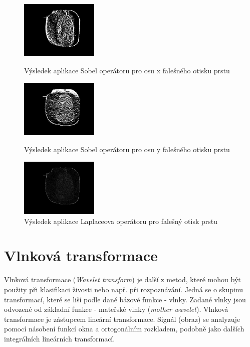 \begin{figure}[!htbp]
  \begin{minipage}[b]{0.3\linewidth}
    \centering
    \includegraphics[width=140px]{obrazky-figures/sobelxfingerprint.png}
    \caption{Výsledek aplikace Sobel operátoru pro osu x falešného otisku prstu}
  \end{minipage}
  \hspace{0.3cm}
  \begin{minipage}[b]{0.3\linewidth}
    \centering
    \includegraphics[width=140px]{obrazky-figures/sobelyfingerprint.png}
    \caption{Výsledek aplikace Sobel operátoru pro osu y falešného otisku prstu}
  \end{minipage}
  \hspace{0.3cm}
    \begin{minipage}[b]{0.3\linewidth}
    \centering
    \includegraphics[width=140px]{obrazky-figures/laplacianfingerprint.png}
    \caption{Výsledek aplikace Laplaceova operátoru pro falešný otisk prstu}
  \end{minipage}
\end{figure}

\section{Vlnková transformace}
Vlnková transformace (\textit{Wavelet transform}) je další z metod, které mohou být použity při klasifikaci živosti nebo např. při rozpoznávání. Jedná se o skupinu transformací, které se liší podle dané bázové funkce - vlnky. Zadané vlnky jsou odvozené od základní funkce - mateřské vlnky (\textit{mother wavelet}). Vlnková transformace je zástupcem lineární transformace. Signál (obraz) se analyzuje pomocí násobení funkcí okna a ortogonálním rozkladem, podobně jako dalších integrálních lineárních transformací. 

